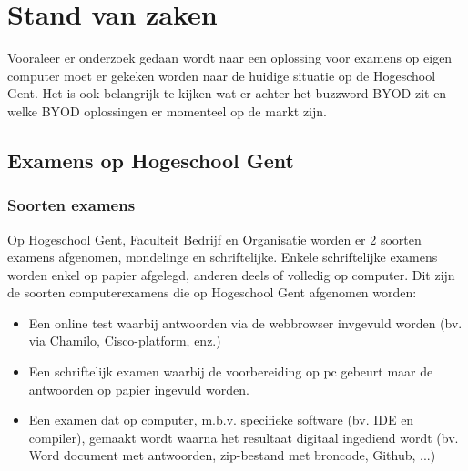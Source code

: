 \chapter{Stand van zaken}
\label{ch:stand-van-zaken}



Vooraleer er onderzoek gedaan wordt naar een oplossing voor examens op eigen computer moet er gekeken worden naar de huidige situatie op de Hogeschool Gent. Het is ook belangrijk te kijken wat er achter het buzzword BYOD zit en welke BYOD oplossingen er momenteel op de markt zijn. 

\section{Examens op Hogeschool Gent}

\subsection{Soorten examens}
Op Hogeschool Gent, Faculteit Bedrijf en Organisatie worden er 2 soorten examens afgenomen, mondelinge en schriftelijke. Enkele schriftelijke examens worden enkel op papier afgelegd, anderen deels of volledig op computer. Dit zijn de soorten computerexamens die op Hogeschool Gent afgenomen worden:
\begin{itemize}
\item Een online test waarbij antwoorden via de webbrowser invgevuld worden (bv. via Chamilo, Cisco-platform, enz.)
\item Een schriftelijk examen waarbij de voorbereiding op pc gebeurt maar de antwoorden op papier ingevuld worden.
\item Een examen dat op computer, m.b.v. specifieke software (bv. IDE en compiler), gemaakt wordt waarna het resultaat digitaal ingediend wordt (bv. Word document met antwoorden, zip-bestand met broncode, Github, ...)
\end{itemize}


